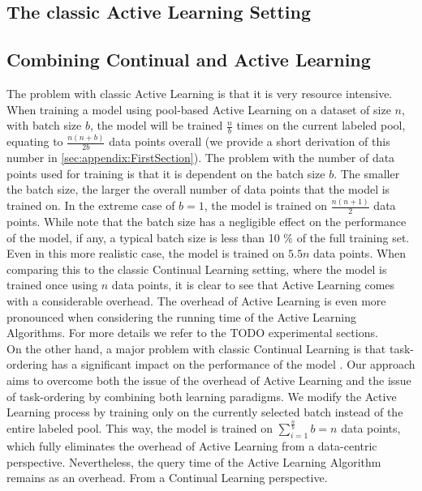 \subsection{The classic Active Learning Setting}
\label{sec:Methodology:ALSetting}

\subsection{Combining Continual and Active Learning}
\label{sec:Methodology:CombiningCLandAL}
The problem with classic Active Learning is that it is very resource intensive. When training a model using pool-based Active Learning on a dataset of size $n$,
with batch size $b$, the model will be trained $\frac{n}{b}$ times on the current labeled pool, equating to $\frac{n(n+b)}{2b}$ data points overall (we provide a
short derivation of this number in \ref{sec:appendix:FirstSection}). The problem with the number of data points used for training is that it is dependent on the
batch size $b$. The smaller the batch size, the larger the overall number of data points that the model is trained on. In the extreme case of $b=1$, the model
is trained on $\frac{n(n+1)}{2}$ data points. While \cite{beck2021effective} note that the batch size has a negligible effect on the performance of the model,
if any, a typical batch size is less than 10 \% of the full training set. Even in this more realistic case, the model is trained on $5.5n$ data points. When
comparing this to the classic Continual Learning setting, where the model is trained once using $n$ data points, it is clear to see that Active Learning comes
with a considerable overhead. The overhead of Active Learning is even more pronounced when considering the running time of the Active Learning Algorithms.
For more details we refer to the TODO experimental sections. \\
On the other hand, a major problem with classic Continual Learning is that task-ordering has a significant impact on the performance of the model \cite{bell2022effect}.
Our approach aims to overcome both the issue of the overhead of Active Learning and the issue of task-ordering by combining both learning paradigms. We modify the Active
Learning process by training only on the currently selected batch instead of the entire labeled pool. This way, the model is trained on $\sum_{i=1}^{\frac{n}{b}} b = n$ 
data points, which fully eliminates the overhead of Active Learning from a data-centric perspective. Nevertheless, the query time of the Active Learning Algorithm remains
as an overhead. From a Continual Learning perspective.


